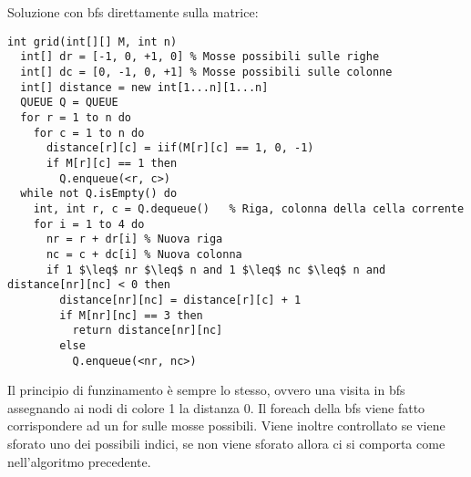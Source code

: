 \documentclass[../cheatSheetAlgoritmi.tex]{subfiles}
\begin{document}
\\\\
Soluzione con bfs direttamente sulla matrice:
\begin{lstlisting}[caption=Griglia quadra]
int grid(int[][] M, int n)
  int[] dr = [-1, 0, +1, 0] % Mosse possibili sulle righe
  int[] dc = [0, -1, 0, +1] % Mosse possibili sulle colonne
  int[] distance = new int[1...n][1...n]
  QUEUE Q = QUEUE
  for r = 1 to n do
    for c = 1 to n do
      distance[r][c] = iif(M[r][c] == 1, 0, -1)
      if M[r][c] == 1 then
        Q.enqueue(<r, c>)
  while not Q.isEmpty() do
    int, int r, c = Q.dequeue()   % Riga, colonna della cella corrente
    for i = 1 to 4 do
      nr = r + dr[i] % Nuova riga
      nc = c + dc[i] % Nuova colonna
      if 1 $\leq$ nr $\leq$ n and 1 $\leq$ nc $\leq$ n and distance[nr][nc] < 0 then
        distance[nr][nc] = distance[r][c] + 1
        if M[nr][nc] == 3 then
          return distance[nr][nc]
        else
          Q.enqueue(<nr, nc>)
\end{lstlisting}
Il principio di funzinamento è sempre lo stesso, ovvero una visita in bfs assegnando ai nodi di colore 1 la distanza 0. Il foreach della bfs viene fatto corrispondere ad un for sulle mosse possibili. Viene inoltre controllato se viene sforato uno dei possibili indici, se non viene sforato allora ci si comporta come nell'algoritmo precedente.
\end{document}
